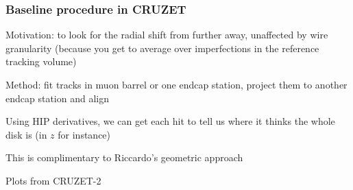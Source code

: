 \documentclass[compress]{beamer}
\begin{document}
\begin{frame}
\frametitle{Baseline procedure in CRUZET}

Motivation: to look for the radial shift from further away, unaffected
by wire granularity (because you get to average over imperfections in
the reference tracking volume)

\vfill Method: fit tracks in muon barrel or one endcap station,
project them to another endcap station and align

\vfill Using HIP derivatives, we can get each hit to tell us where it
thinks the whole disk is (in $z$ for instance)

\vfill This is complimentary to Riccardo's geometric approach

\vfill Plots from CRUZET-2
\end{frame}
\end{document}
